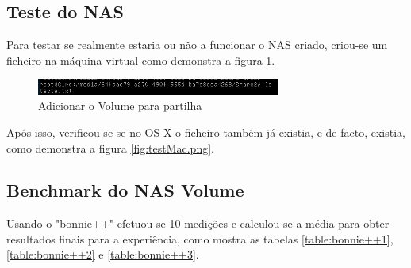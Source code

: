 \documentclass[pdftex,12pt,a4paper]{report}
\begin{document}
\subsection{Teste do NAS}

Para testar se realmente estaria ou não a funcionar o NAS criado, criou-se um ficheiro na máquina virtual como demonstra a figura \ref{fig:CreateTestVM}.

\begin{figure}[!htb]
\center
 \includegraphics[width=80mm,scale=1]{imagens/CreateTestVM.png}
 \caption{Adicionar o Volume para partilha}
 \label{fig:CreateTestVM}
\end{figure}

Após isso, verificou-se se no OS X o ficheiro também já existia, e de facto, existia, como demonstra a figura \ref{fig:testMac.png}.

\subsection{Benchmark do NAS Volume}

Usando o "bonnie++" efetuou-se 10 medições e calculou-se a média para obter resultados finais para a experiência, como mostra as tabelas \ref{table:bonnie++1}, \ref{table:bonnie++2} e \ref{table:bonnie++3}.
\end{document}
